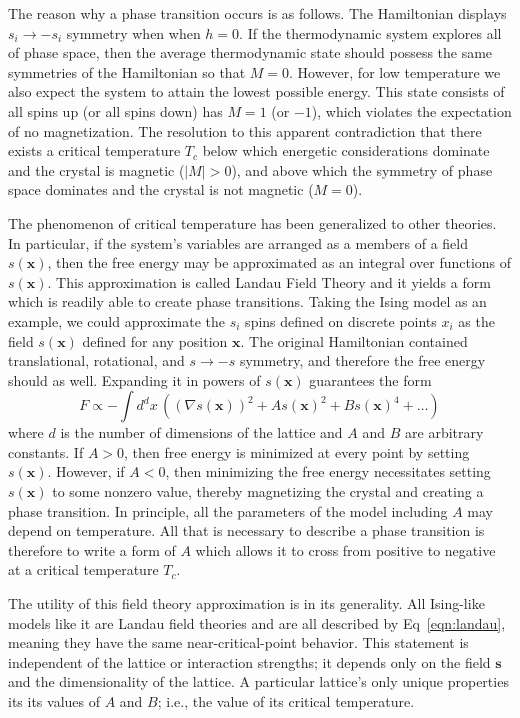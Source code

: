 \documentclass[amsmath,amssymb,aps,twocolumn,nofootinbib]{revtex4-2}
\newcommand{\parens}[1]{\left ( #1 \right )}
\begin{document}
The reason why a phase transition occurs is as follows. The Hamiltonian displays $s_i\rightarrow -s_i$ symmetry when when $h=0$. If the thermodynamic system explores all of phase space, then the average thermodynamic state should possess the same symmetries of the Hamiltonian so that $M=0$. However, for low temperature we also expect the system to attain the lowest possible energy. This state consists of all spins up (or all spins down) has $M = 1$ (or $-1$), which violates the expectation of no magnetization. The resolution to this apparent contradiction that there exists a critical temperature $T_c$ below which energetic considerations dominate and the crystal is magnetic ($|M|>0$), and above which the symmetry of phase space dominates and the crystal is not magnetic ($M = 0$).

The phenomenon of critical temperature has been generalized to other theories. In particular, if the system's variables are arranged as a members of a field $s(\bm x)$, then the free energy may be approximated as an integral over functions of $s(\bm x)$. This approximation is called Landau Field Theory and it yields a form which is readily able to create phase transitions. Taking the Ising model as an example, we could approximate the $s_i$ spins defined on discrete points $x_i$ as the field $s(\bm x)$ defined for any position $\bm x$. The original Hamiltonian contained translational, rotational, and $s\rightarrow-s$ symmetry, and therefore the free energy should as well. Expanding it in powers of $s(\bm x)$ guarantees the form
\begin{equation}
F \propto -\int d^d x \, \parens{(\nabla s(\bm x))^2 + A s(\bm x)^2 + B s(\bm x)^4 + \dots}
\label{eqn:landau}
\end{equation}
where $d$ is the number of dimensions of the lattice and $A$ and $B$ are arbitrary constants. If $A>0$, then free energy is minimized at every point by setting $s(\bm x)$. However, if $A<0$, then minimizing the free energy necessitates setting $s(\bm x)$ to some nonzero value, thereby magnetizing the crystal and creating a phase transition. In principle, all the parameters of the model including $A$ may depend on temperature. All that is necessary to describe a phase transition is therefore to write a form of $A$ which allows it to cross from positive to negative at a critical temperature $T_c$.

The utility of this field theory approximation is in its generality. All Ising-like models like it are Landau field theories and are all described by Eq~\ref{eqn:landau}, meaning they have the same near-critical-point behavior. This statement is independent of the lattice or interaction strengths; it depends only on the field $\bm s$ and the dimensionality of the lattice. A particular lattice's only unique properties its its values of $A$ and $B$; i.e., the value of its critical temperature.
\end{document}
